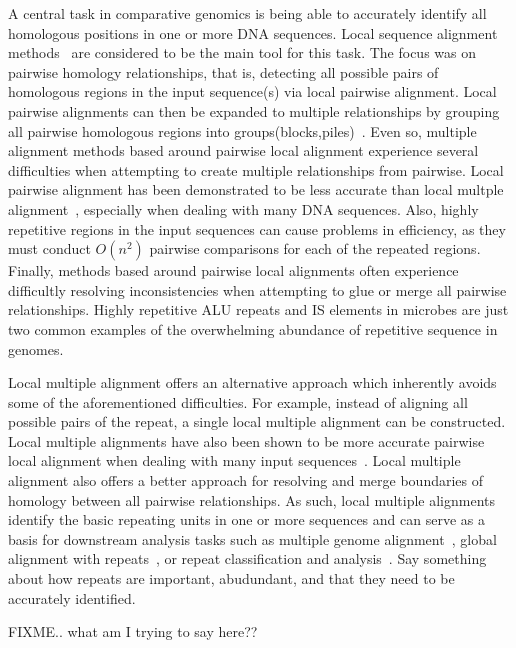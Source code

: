 \documentclass{llncs}
\begin{document}
A central task in comparative genomics is being able to accurately identify all homologous positions in one or more DNA sequences. Local sequence alignment methods~\cite{blast,...} are considered to be the main tool for this task. The focus was on pairwise homology relationships, that is, detecting all possible pairs of homologous regions in the input sequence(s) via local pairwise alignment.  Local pairwise alignments can then be expanded to multiple relationships by grouping all pairwise homologous regions into groups(blocks,piles)~\cite{...}. Even so, multiple alignment methods based around pairwise local alignment experience several difficulties when attempting to create multiple relationships from pairwise. Local pairwise alignment has been demonstrated to be less accurate than local multple alignment~\cite{...}, especially when dealing with many DNA sequences. Also, highly repetitive regions in the input sequences can cause problems in efficiency, as they must conduct $O(n^{2})$ pairwise comparisons for each of the repeated regions.  Finally, methods based around pairwise local alignments often experience difficultly resolving inconsistencies when attempting to glue or merge all pairwise relationships. Highly repetitive ALU repeats and IS elements in microbes are just two common examples of the overwhelming abundance of repetitive sequence in genomes.

Local multiple alignment offers an alternative approach which inherently avoids some of the aforementioned difficulties. For example, instead of aligning all possible pairs of the repeat, a single local multiple alignment can be constructed. Local multiple alignments have also been shown to be more accurate pairwise local alignment when dealing with many input sequences~\cite{cite a paper which shows multiple alignment is more accurate than pairwise alignment}. Local multiple alignment also offers a better approach for resolving and merge boundaries of homology between all pairwise relationships.  As such, local multiple alignments identify the basic repeating units in one or
more sequences and can serve as a basis for downstream analysis
tasks such as multiple genome alignment~\cite{ref-mauve,ref-mga,ref-mgcat,ref-deweyReview}, global
alignment with repeats~\cite{ref-otherSammethPaper,ref-aba}, or
repeat classification and analysis~\cite{ref-piler}. Say something about how repeats are important, abudundant, and that they need to be accurately identified.

FIXME.. what am I trying to say here??
\end{document}
